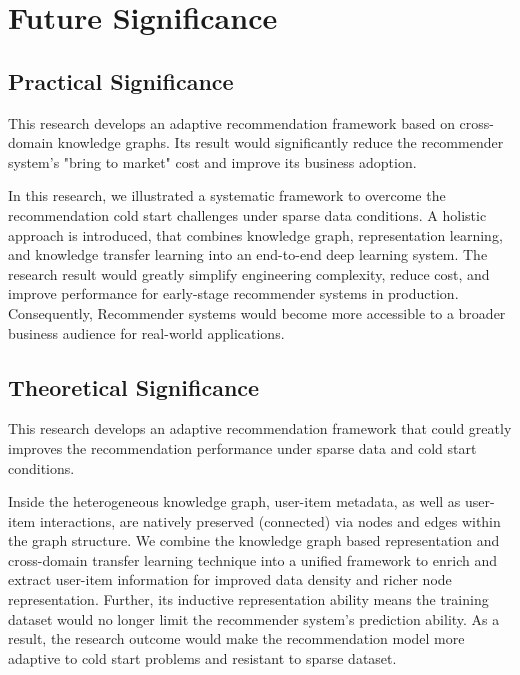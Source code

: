 \section{Future Significance}

\subsection{Practical Significance}
This research develops an adaptive recommendation framework based on cross-domain knowledge graphs. Its result would significantly reduce the recommender system's "bring to market" cost and improve its business adoption.

In this research, we illustrated a systematic framework to overcome the recommendation cold start challenges under sparse data conditions. 
A holistic approach is introduced, that combines knowledge graph, representation learning, and knowledge transfer learning into an end-to-end deep learning system. 
The research result would greatly simplify engineering complexity, reduce cost, and improve performance for early-stage recommender systems in production. Consequently, Recommender systems would become more accessible to a broader business audience for real-world applications.


\subsection{Theoretical Significance}
This research develops an adaptive recommendation framework that could greatly improves the recommendation performance under sparse data and cold start conditions.

Inside the heterogeneous knowledge graph, user-item metadata, as well as user-item interactions, are natively preserved (connected) via nodes and edges within the graph structure.  We combine the knowledge graph based representation and cross-domain transfer learning technique into a unified framework to enrich and extract user-item information for improved data density and richer node representation. Further, its inductive representation ability means the training dataset would no longer limit the recommender system's prediction ability. 
As a result, the research outcome would make the recommendation model more adaptive to cold start problems and resistant to sparse dataset.





